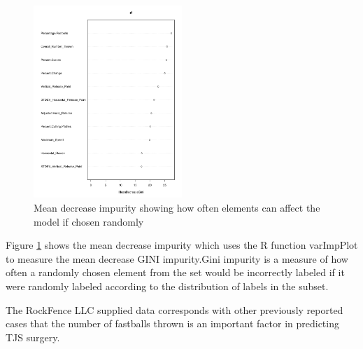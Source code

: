 \begin{figure}[h]
    \centering
        \includegraphics[width=0.5\textwidth]{meanDecreaseGINI}
    \caption{Mean decrease impurity showing how often elements can affect the model if chosen randomly}
    \label{fig:mdg}
\end{figure}

Figure \ref{fig:mdg} shows the mean decrease impurity which uses the R function varImpPlot to measure the mean decrease GINI impurity.Gini impurity is a measure of how often a randomly chosen element from the set would be incorrectly labeled if it were randomly labeled according to the distribution of labels in the subset.

The RockFence LLC supplied data corresponds with other previously reported cases that the number of fastballs thrown is an important factor in predicting TJS surgery.
